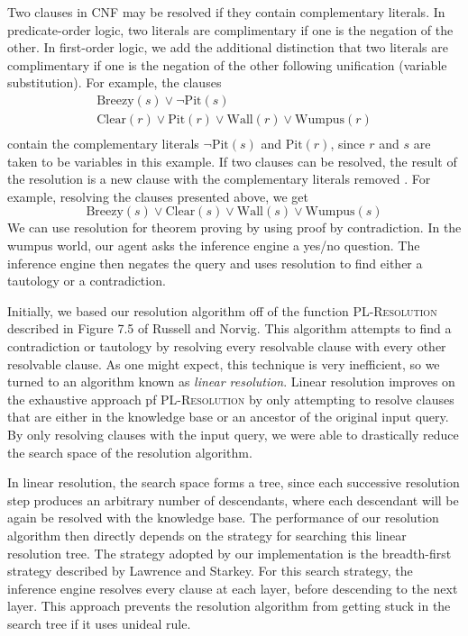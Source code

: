 \documentclass{article}
\begin{document}
Two clauses in CNF may be resolved if they contain complementary literals. In predicate-order logic, two literals are complimentary if one is the negation of the other. 
In first-order logic, we add the additional distinction that two literals are complimentary if one is the negation of the other following unification (variable substitution)\cite{ai}. 
For example, the clauses
\begin{gather*}
\text{Breezy}(s) \lor \neg \text{Pit}(s) \\
\text{Clear}(r) \lor \text{Pit}(r) \lor \text{Wall}(r) \lor \text{Wumpus}(r) \\
\end{gather*}
contain the complementary literals $\neg \text{Pit}(s)$ and $\text{Pit}(r)$, since $r$ and $s$ are taken to be variables in this example. 
If two clauses can be resolved, the result of the resolution is a new clause with the complementary literals removed \cite{ai}. 
For example, resolving the clauses presented above, we get
\begin{equation*}
\text{Breezy}(s) \lor \text{Clear}(s) \lor \text{Wall}(s) \lor \text{Wumpus}(s)
\end{equation*}
We can use resolution for theorem proving by using proof by contradiction. 
In the wumpus world, our agent asks the inference engine a yes/no question.
The inference engine then negates the query and uses resolution to find either a tautology or a contradiction.

Initially, we based our resolution algorithm off of the function \textsc{PL-Resolution} described in Figure 7.5 of Russell and Norvig. 
This algorithm attempts to find a contradiction or tautology by resolving every resolvable clause with every other resolvable clause. 
As one might expect, this technique is very inefficient, so we turned to an algorithm known as \textit{linear resolution}. 
Linear resolution improves on the exhaustive approach pf \textsc{PL-Resolution} by only attempting to resolve clauses that are either in the knowledge base or an ancestor of the original input query\cite{ai}. 
By only resolving clauses with the input query, we were able to drastically reduce the search space of the resolution algorithm.

In linear resolution, the search space forms a tree, since each successive resolution step produces an arbitrary number of descendants, where each descendant will be again be resolved with the knowledge base. The performance of our resolution algorithm then directly depends on the strategy for searching this linear resolution tree. The strategy adopted by our implementation is the breadth-first strategy described by Lawrence and Starkey. For this search strategy, the inference engine resolves every clause at each layer, before descending to the next layer. This approach prevents the resolution algorithm from getting stuck in the search tree if it uses unideal rule.
\end{document}
